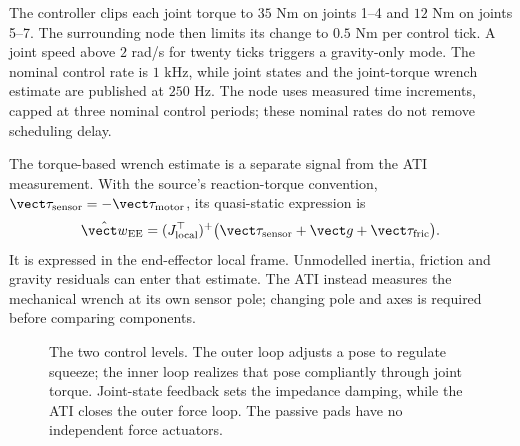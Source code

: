 The controller clips each joint torque to $35$ Nm on joints 1--4 and $12$ Nm on joints 5--7. The surrounding node then limits its change to $0.5$ Nm per control tick. A joint speed above $2$ rad/s for twenty ticks triggers a gravity-only mode. The nominal control rate is $1$ kHz, while joint states and the joint-torque wrench estimate are published at $250$ Hz. The node uses measured time increments, capped at three nominal control periods; these nominal rates do not remove scheduling delay.

The torque-based wrench estimate is a separate signal from the ATI measurement. With the source's reaction-torque convention, $\vect\tau_{\mathrm{sensor}}=-\vect\tau_{\mathrm{motor}}$, its quasi-static expression is
\begin{equation}
\hat{\vect w}_{\mathrm{EE}}=(J_{\mathrm{local}}^\top)^+
\bigl(\vect\tau_{\mathrm{sensor}}+\vect g+\vect\tau_{\mathrm{fric}}\bigr).
\label{eq:kinova-wrench-estimate}
\end{equation}
It is expressed in the end-effector local frame. Unmodelled inertia, friction and gravity residuals can enter that estimate. The ATI instead measures the mechanical wrench at its own sensor pole; changing pole and axes is required before comparing components.

\begin{figure}[htbp]\centering
{}
\caption{The two control levels. The outer loop adjusts a pose to regulate squeeze; the inner loop realizes that pose compliantly through joint torque. Joint-state feedback sets the impedance damping, while the ATI closes the outer force loop. The passive pads have no independent force actuators.}
\label{fig:kinova-control-blocks}
\end{figure}

